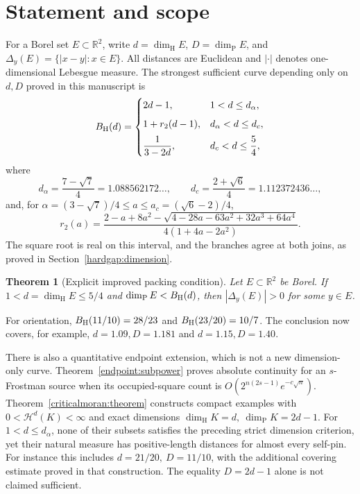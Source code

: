 \documentclass[11pt]{article}
\newtheorem{theorem}{Theorem}[section]
\theoremstyle{definition}\newtheorem{remark}[theorem]{Remark}
\newcommand{\R}{\mathbb R}\newcommand{\HH}{\dim_{\mathrm H}}\newcommand{\PP}{\dim_{\mathrm P}}
\begin{document}
\begingroup
\small\setlength{\parskip}{0pt}\setcounter{tocdepth}{1}
\tableofcontents
\endgroup
\clearpage
\section{Statement and scope}
For a Borel set \(E\subset\R^2\), write \(d=\HH E\), \(D=\PP E\), and
\(\Delta_y(E)=\{|x-y|:x\in E\}\). All distances are Euclidean and
\(|\cdot|\) denotes one-dimensional Lebesgue measure. The strongest sufficient
curve depending only on \(d,D\) proved in this manuscript is
\begin{equation}\label{hardgap:curve}
 B_{\rm H}(d)=\begin{cases}
 2d-1,&1<d\le d_\alpha,\\[5pt]
 1+r_2(d-1),&d_\alpha<d\le d_c,\\[5pt]
 \dfrac1{3-2d},&d_c<d\le\dfrac54,
 \end{cases}
\end{equation}
where
\[
 d_\alpha=\frac{7-\sqrt7}{4}=1.088562172\ldots,\qquad
 d_c=\frac{2+\sqrt6}{4}=1.112372436\ldots,
\]
and, for \(\alpha=(3-\sqrt7)/4\le a\le a_c=(\sqrt6-2)/4\),
\begin{equation}\label{hardgap:rootformula}
 r_2(a)=\frac{2-a+8a^2-\sqrt{4-28a-63a^2+32a^3+64a^4}}
                  {4(1+4a-2a^2)}.
\end{equation}
The square root is real on this interval, and the branches agree at both
joins, as proved in Section~\ref{hardgap:dimension}.

\begin{theorem}[Explicit improved packing condition]\label{target:hardgap}
Let \(E\subset\R^2\) be Borel. If \(1<d=\HH E\le5/4\) and
\(\PP E<B_{\rm H}(d)\), then \(|\Delta_y(E)|>0\) for some \(y\in E\).
\end{theorem}

For orientation, \(B_{\rm H}(11/10)=28/23\) and
\(B_{\rm H}(23/20)=10/7\). The conclusion now covers, for example,
\(d=1.09,D=1.181\) and \(d=1.15,D=1.40\).

There is also a quantitative endpoint extension, which is not a new
dimension-only curve. Theorem~\ref{endpoint:subpower} proves absolute
continuity for an \(s\)-Frostman source when its occupied-square count is
\(O(2^{n(2s-1)}e^{-c\sqrt n})\).
Theorem~\ref{criticalmoran:theorem} constructs compact examples with
\(0<\mathcal H^d(K)<\infty\) and exact dimensions
\(\HH K=d,\ \PP K=2d-1\).
For \(1<d\le d_\alpha\), none of their subsets satisfies the preceding
strict dimension criterion, yet their natural measure has positive-length
distances for almost every self-pin. For instance this includes
\(d=21/20,\ D=11/10\), with the additional covering estimate proved
in that construction. The equality \(D=2d-1\) alone is not claimed sufficient.
\end{document}
